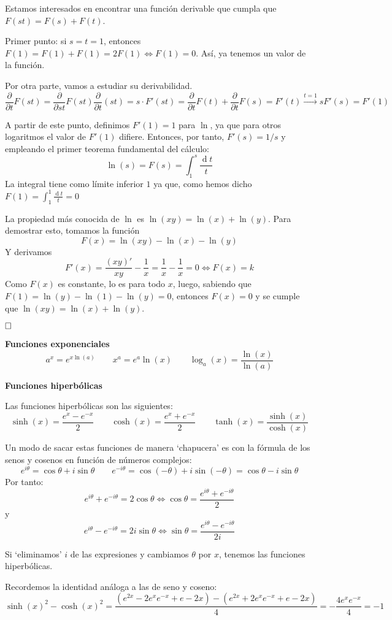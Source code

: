 \documentclass[a4paper]{article}
\renewcommand{\d}[1]{\ensuremath{\operatorname{d}\!{#1}}}
\newcommand{\parfrac}[1]{\frac{\partial}{\partial {#1}}}
\newcommand{\qed}{\begin{flushright}
		{$\newline\square$}
	\end{flushright}}
\begin{document}
Estamos interesados en encontrar una función derivable que cumpla que $F(st) = F(s) + F(t)$.

Primer punto: si $s=t=1$, entonces $F(1) = F(1) + F(1) = 2F(1) \iff F(1) = 0$. Así, ya tenemos un valor de la función.

Por otra parte, vamos a estudiar su derivabilidad. 
\[ \parfrac{t} F(st) = \parfrac{st} F(st) \parfrac{t}(st) = s\cdot F'(st)  = \parfrac{t}F(t) + \parfrac{t}F(s) = F'(t) \xrightarrow{t = 1} sF'(s) = F'(1) \]

A partir de este punto, definimos $F'(1) = 1$ para $\ln$, ya que para otros logaritmos el valor de $F'(1)$ difiere. Entonces, por tanto, $F'(s) = 1/s$ y empleando el primer teorema fundamental del cálculo:
$$\ln(s) = F(s) = \int_1^s \frac{\d t}{t}$$
La integral tiene como límite inferior $1$ ya que, como hemos dicho $F(1) = \int_1^1 \frac{\d t}{t} = 0$

La propiedad más conocida de $\ln$ es $\ln(xy) = \ln(x)+\ln(y)$. Para demostrar esto, tomamos la función
$$F(x) = \ln(xy) - \ln(x) - \ln(y)$$
Y derivamos
$$F'(x) = \frac{(xy)'}{xy} - \frac{1}{x} = \frac{1}{x} - \frac{1}{x} = 0 \iff F(x) = k$$
Como $F(x)$ es constante, lo es para todo $x$, luego, sabiendo que $F(1) = \ln(y) - \ln(1) - \ln(y) = 0$, entonces $F(x) = 0$ y se cumple que $\ln(xy) = \ln(x) + \ln(y)$.\qed
\textbf{Funciones exponenciales}
$$a^x = e^{x\ln(a)} \qquad x^a = e^a\ln(x)\qquad \log_a(x) = \frac{\ln(x)}{\ln(a)}$$


\textbf{Funciones hiperbólicas}

Las funciones hiperbólicas son las siguientes:
$$\sinh(x) = \frac{e^x-e^{-x}}{2} \qquad \cosh(x) = \frac{e^x+e^{-x}}{2} \qquad \tanh(x) = \frac{\sinh(x)}{\cosh(x)}$$

Un modo de sacar estas funciones de manera `chapucera' es con la fórmula de los senos y cosenos en función de números complejos:
$$e^{i\theta} = \cos\theta + i\sin\theta \qquad e^{-i\theta} = \cos(-\theta) + i\sin(-\theta) =\cos\theta - i\sin\theta $$
Por tanto:
$$e^{i\theta} + e^{-i\theta} = 2\cos\theta \iff \cos\theta = \frac{e^{i\theta} + e^{-i\theta}}{2}$$
y
$$e^{i\theta} - e^{-i\theta} = 2i\sin\theta \iff \sin\theta = \frac{e^{i\theta} - e^{-i\theta}}{2i}$$

Si `eliminamos' $i$ de las expresiones y cambiamos $\theta$ por $x$, tenemos las funciones hiperbólicas.

Recordemos la identidad análoga a las de seno y coseno: 
$$\sinh(x)^2-\cosh(x)^2 = \frac{(e^{2x}-2e^xe^{-x}+e-2x) - (e^{2x}+2e^xe^{-x}+e-2x)}{4} = -\frac{4e^xe^{-x}}{4} = -1$$
\end{document}
